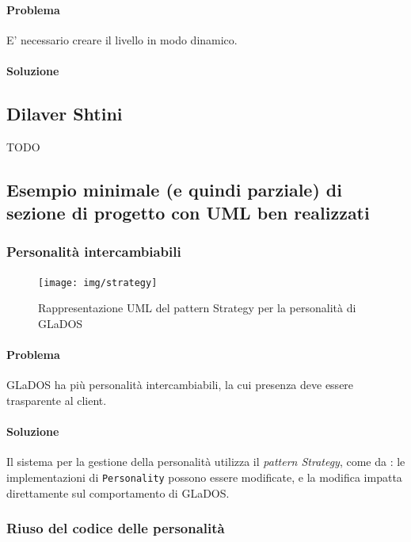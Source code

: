 \documentclass[a4paper,12pt]{report}
\begin{document}
\paragraph{Problema} E' necessario creare il livello in modo dinamico.

\paragraph{Soluzione}



\subsection*{Dilaver Shtini}
{TODO}

\subsection*{Esempio minimale (e quindi parziale) di sezione di progetto con UML ben realizzati}

\subsubsection{Personalità intercambiabili}

\begin{figure}[H]
    \centering{}
    \texttt{[image: img/strategy]}
    \caption{Rappresentazione UML del pattern Strategy per la personalità di GLaDOS}
    \label{img:strategy}
\end{figure}

\paragraph{Problema} GLaDOS ha più personalità intercambiabili, la cui presenza deve essere trasparente al client.

\paragraph{Soluzione} Il sistema per la gestione della personalità utilizza il \textit{pattern Strategy}, come da
: le implementazioni di \texttt{Personality} possono essere modificate, e la
modifica impatta direttamente sul comportamento di GLaDOS.

\subsubsection{Riuso del codice delle personalità}
\end{document}
